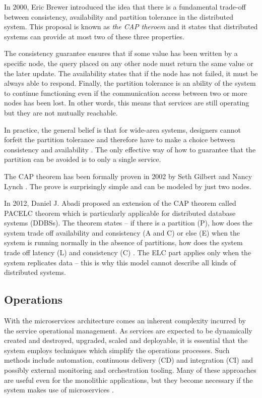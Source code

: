 \documentclass[oneside,
  digital, %
  table,   %
  nolof,     %
  nolot,     %
]{fithesis3}
\begin{document}
In 2000, Eric Brewer introduced the idea that there is a fundamental trade-off between consistency, availability and partition tolerance \cite{persp_cap} in the distributed system. This proposal is known as \textit{the CAP theroem} and it states that distributed systems can provide at most two of these three properties.

The consistency guarantee ensures that if some value has been written by a specific node, the query placed on any other node must return the same value or the later update. The availability states that if the node has not failed, it must be always able to respond. Finally, the partition tolerance is an ability of the system to continue functioning even if the communication access between two or more nodes has been lost. In other words, this means that services are still operating but they are not mutually reachable.

In practice, the general belief is that for wide-area systems, designers cannot forfeit the partition tolerance and therefore have to make a choice between consistency and availability \cite{cap_12years}. The only effective way of how to guarantee that the partition can be avoided is to only a single service.

The CAP theorem has been formally proven in 2002 by Seth Gilbert and Nancy Lynch \cite{cap_prove}. The prove is surprisingly simple and can be modeled by just two nodes.

In 2012, Daniel J. Abadi proposed an extension of the CAP theorem called PACELC theorem which is particularly applicable for distributed database systems (DDBSs). The theorem states -- if there is a partition (P), how does the system trade off availability and consistency (A and C) or else (E) when the system is running normally in the absence of partitions, how does the system trade off latency (L) and consistency (C) \cite{pacelc}. The ELC part applies only when the system replicates data -- this is why this model cannot describe all kinds of distributed systems.

\subsection{Operations}

With the microservices architecture comes an inherent complexity incurred by the service operational management. As services are expected to be dynamically created and destroyed, upgraded, scaled and deployable, it is essential that the system employs techniques which simplify the operations processes. Such methods include automation, continuous delivery (CD) and integration (CI) and possibly external monitoring and orchestration tooling. Many of these approaches are useful even for the monolithic applications, but they become necessary if the system makes use of microservices \cite{ms_tradeoffs}.
\end{document}
